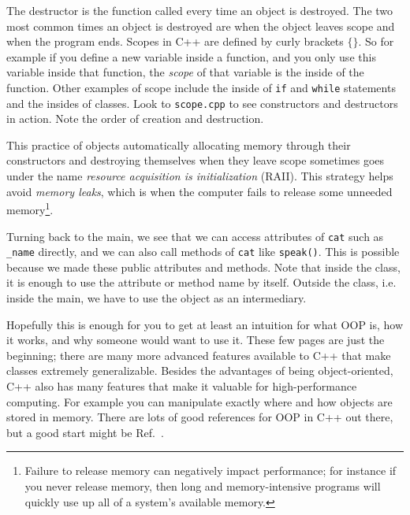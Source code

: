 \begin{code*}
\end{code*}

The destructor is the function called every time an object is destroyed.
The two most common times an object is destroyed are when the object
leaves scope and when the program ends. Scopes in C++ are defined by
curly brackets $\{\}$. So for example if you define a new variable
inside a function, and you only use this variable inside that function,
the {\it scope} of that variable is the inside of the function. 
Other examples of scope include
the inside of \texttt{if} and \texttt{while} statements and the
insides of classes. Look to \texttt{scope.cpp} to see constructors and
destructors in action. Note the order of creation and destruction.

This practice of objects automatically allocating memory through their
constructors and destroying themselves when they leave scope
sometimes goes under the name
{\it resource acquisition is initialization} (RAII).
This strategy helps avoid {\it memory leaks},
which is when the computer fails to release some unneeded 
memory\footnote{Failure to release memory can negatively impact performance;
for instance if you never release memory, then long and memory-intensive
programs will quickly use up all of a system's available memory.}.

Turning back to the main, we see that we can access attributes of
\texttt{cat} such as \texttt{\_name} directly, and we can also call
methods of \texttt{cat} like \texttt{speak()}. This is possible because
we made these public attributes and methods. Note that inside the class,
it is enough to use the attribute or method name by itself. Outside the
class, i.e. inside the main, we have to use the object as an 
intermediary.

Hopefully this is enough for you to get at least an intuition for
what OOP is, how it works, and why someone would want to use it. These
few pages are just the beginning; there are many more advanced
features available to C++ that make classes extremely generalizable.
Besides the advantages of being object-oriented, C++ also has many
features that make it valuable for high-performance computing.
For example you can manipulate exactly where and how objects
are stored in memory. There are lots of good references for OOP
in C++ out there, but a good start might be Ref.~\cite{tp:cpp}.\\

